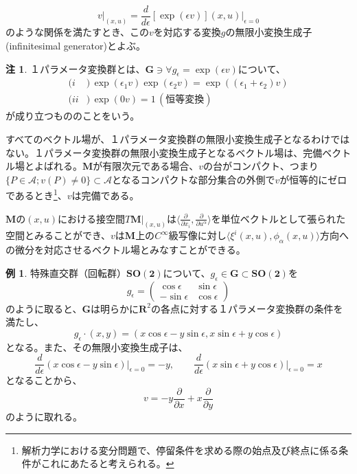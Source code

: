 \documentclass[a4paper, 11pt]{report}
\theoremstyle{definition}
\newtheorem*{remark*}{注}
\newtheorem*{example*}{例}
\begin{document}
\begin{equation*}
v\vert_{(x,u)} = \frac{d}{d\epsilon}[\exp (\epsilon v)](x,u)\vert _{\epsilon=0}
\end{equation*}
のような関係を満たすとき、この$v$を対応する変換$g$の無限小変換生成子(infinitesimal generator)とよぶ。

\begin{remark*}
 １パラメータ変換群とは、$\mathbf{G}\ni \forall g_\epsilon =\exp (\epsilon v)$について、
\begin{align*}
(i &) \, \exp(\epsilon_1 v) \exp(\epsilon_2 v) = \exp((\epsilon_1+\epsilon_2) v)\\
(ii&) \, \exp(0v) = 1 \, (\text{恒等変換})
\end{align*}
が成り立つもののことをいう。

 すべてのベクトル場が、１パラメータ変換群の無限小変換生成子となるわけではない。１パラメータ変換群の無限小変換生成子となるベクトル場は、完備ベクトル場とよばれる。$\mathbf{M}$が有限次元である場合、$v$の台がコンパクト、つまり$\{ P\in\mathcal{A};v(P)\ne 0\} \subset \mathcal{A}$となるコンパクトな部分集合の外側で$v$が恒等的にゼロであるとき\footnote{解析力学における変分問題で、停留条件を求める際の始点及び終点に係る条件がこれにあたると考えられる。}、$v$は完備である。

 $\mathbf{M}$の$(x,u)$における接空間$T\mathbf{M}|_{(x,u)}$は$\langle \frac{\partial }{\partial x_i},\frac{\partial }{\partial u^\alpha} \rangle$を単位ベクトルとして張られた空間とみることができ、$v$は$\mathbf{M}$上の$C^\infty$級写像に対し$\langle \xi^i(x,u),\phi_\alpha(x,u) \rangle$方向への微分を対応させるベクトル場とみなすことができる。
\end{remark*}

\begin{example*}
 特殊直交群（回転群）$\mathbf{SO(2)}$について、$g_{\epsilon}\in\mathbf{G}\subset \mathbf{SO(2)}$を
\[
g_{\epsilon} = \left(
\begin{array}{cc}
\cos \epsilon & \sin \epsilon \\
-\sin \epsilon & \cos \epsilon
\end{array}
\right)
\]
のように取ると、$\mathbf{G}$は明らかに$\mathbf{R}^2$の各点に対する１パラメータ変換群の条件を満たし、
\begin{equation*}
g_{\epsilon}\cdot(x, y) = (x\cos \epsilon - y\sin \epsilon , x\sin \epsilon + y\cos \epsilon)
\end{equation*}
となる。また、その無限小変換生成子は、
\begin{equation*}
\frac{d}{d\epsilon}(x\cos \epsilon - y\sin \epsilon)\vert_{\epsilon =0}=-y, \qquad \frac{d}{d\epsilon}(x\sin \epsilon + y\cos \epsilon)\vert_{\epsilon =0}=x
\end{equation*}
となることから、
\begin{equation*}
v = -y\frac{\partial}{\partial x}+x\frac{\partial}{\partial y}
\end{equation*}
のように取れる。
\end{example*}
\end{document}

